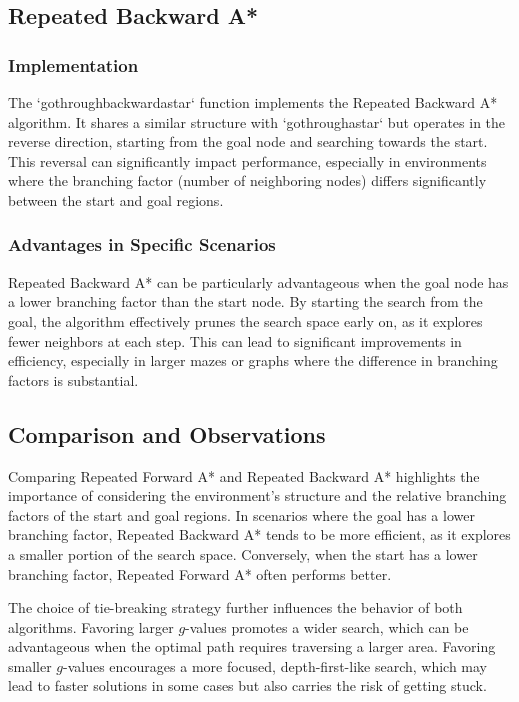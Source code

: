 \documentclass[12pt]{article}
\begin{document}
\subsection{Repeated Backward A*}

\subsubsection{Implementation}

The `gothroughbackwardastar` function implements the Repeated Backward A* algorithm.
It shares a similar structure with `gothroughastar` but operates in the reverse direction,
starting from the goal node and searching towards the start.
This reversal can significantly impact performance,
especially in environments where the branching factor 
(number of neighboring nodes)
differs significantly between the start and goal regions.

\subsubsection{Advantages in Specific Scenarios}

Repeated Backward A* can be particularly advantageous when the goal node has a lower branching factor than the start node. 
By starting the search from the goal, the algorithm effectively prunes the search space early on, 
as it explores fewer neighbors at each step. 
This can lead to significant improvements in efficiency, 
especially in larger mazes or graphs where the difference in branching factors is substantial.

\subsection{Comparison and Observations}

Comparing Repeated Forward A* and Repeated Backward A* highlights the importance of considering the environment's structure and the relative branching factors of the start and goal regions. 
In scenarios where the goal has a lower branching factor, 
Repeated Backward A* tends to be more efficient, 
as it explores a smaller portion of the search space. 
Conversely, 
when the start has a lower branching factor, 
Repeated Forward A* often performs better.

The choice of tie-breaking strategy further influences the behavior of both algorithms. 
Favoring larger $g$-values promotes a wider search, 
which can be advantageous when the optimal path requires traversing a larger area. 
Favoring smaller $g$-values encourages a more focused, 
depth-first-like search, 
which may lead to faster solutions in some cases but also carries the risk of getting stuck.
\end{document}

